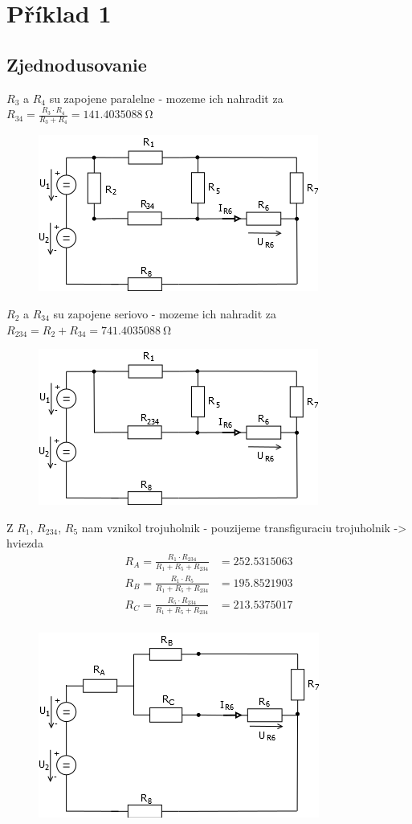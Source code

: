 \section{Příklad 1}
\subsection{Zjednodusovanie}
$R_3$ a $R_4$ su zapojene paralelne - mozeme ich nahradit za $R_{34} = \frac{R_3 \cdot R_4}{R_3 + R_4} = \SI{141.4035088}{\ohm}$
\begin{figure}[!h]
    \centering
    \includegraphics[width=0.5\linewidth]{pr1/2.png}
 \end{figure}
 
$R_2$ a $R_{34}$ su zapojene seriovo - mozeme ich nahradit za $R_{234} = R_2 + R_{34} = \SI{741.4035088}{\ohm}$
\begin{figure}[!h]
    \centering
    \includegraphics[width=0.5\linewidth]{pr1/3.png}
\end{figure}
\newpage

Z $R_{1}$, $R_{234}$, $R_{5}$ nam vznikol trojuholnik - pouzijeme transfiguraciu trojuholnik -> hviezda
\begin{align*}
    R_A = \frac{R_1 \cdot R_{234}}{R_1 + R_5 + R_234} &= 252.5315063\\
    R_B = \frac{R_1 \cdot R_{5}}{R_1 + R_5 + R_234} &= 195.8521903\\
    R_C = \frac{R_5 \cdot R_{234}}{R_1 + R_5 + R_234} &= 213.5375017\\
\end{align*}
\begin{figure}[!h]
    \centering
    \includegraphics[width=0.5\linewidth]{pr1/4.png}
\end{figure}

